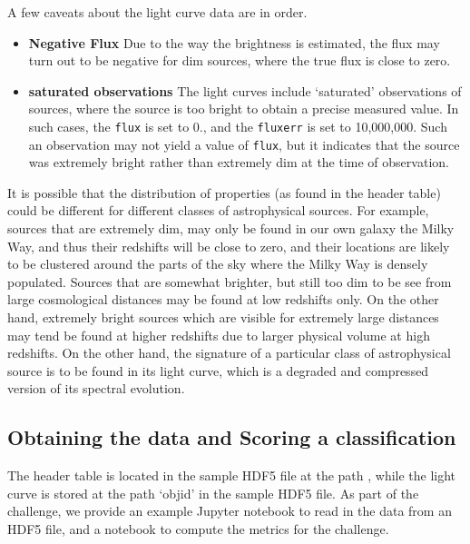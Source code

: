 \documentclass[\docopts]{\docclass}
\begin{document}
A few caveats about the light curve data are in order.
\begin{itemize}
    \item \textbf{Negative Flux} Due to the way the brightness is estimated, the flux may turn out to be negative for dim sources, where the true flux is close to zero. 
    \item \textbf{saturated observations} The light curves include `saturated' observations of sources, where the source is
too bright to obtain a precise measured value. In such cases, the {\tt flux} is set to 0., and the {\tt fluxerr} is set to 10,000,000. Such an observation may not yield a value of {\tt flux}, but it indicates that the source was extremely bright rather than extremely dim at the time of observation. 
\end{itemize}

\clearpage
It is possible that the distribution of properties (as found in the header table) could be different for different classes of astrophysical sources. For example, sources that are extremely dim, may only be found in our own galaxy the Milky Way, and thus their redshifts will be close to zero, and their locations are likely to be clustered around the parts of the sky where the Milky Way is densely populated. Sources that are somewhat brighter, but still too dim to be see from large cosmological distances may be found at low redshifts only. On the other hand, extremely bright sources which are visible for extremely large distances may tend be found at higher redshifts due to larger physical volume at high redshifts. On the other hand, the signature of a particular class of astrophysical source is to be found in its light curve, which is a degraded and compressed version of its spectral evolution. 

\subsection{Obtaining the data and Scoring a classification}
The header table is located in the sample HDF5 file at the path {\header}, while the light curve is stored at the path `objid' in the sample HDF5 file. As part of the challenge, we provide an example Jupyter notebook to read in the data from an HDF5 file, and a notebook to compute the metrics for the challenge.
\end{document}
